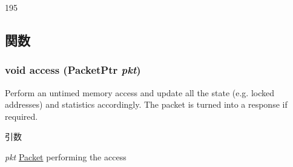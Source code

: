 \begin{DoxyCode}
195 {}
\end{DoxyCode}


\subsection{関数}
\hypertarget{classAbstractMemory_aac5d96736802cb79fb2287135bcc1dff}{
\subsubsection[{access}]{\setlength{\rightskip}{0pt plus 5cm}void access ({\bf PacketPtr} {\em pkt})}}
\label{classAbstractMemory_aac5d96736802cb79fb2287135bcc1dff}
Perform an untimed memory access and update all the state (e.g. locked addresses) and statistics accordingly. The packet is turned into a response if required.


\begin{DoxyParams}{引数}
\item[{\em pkt}]\hyperlink{classPacket}{Packet} performing the access \end{DoxyParams}




